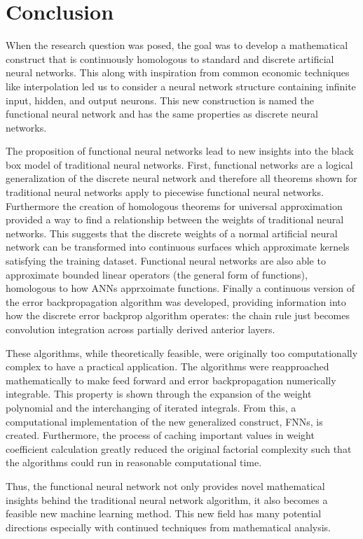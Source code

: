 \section{Conclusion}
When the research question was posed, the goal was to develop a mathematical construct that is continuously homologous to standard and discrete artificial neural networks. This along with inspiration from common economic techniques like interpolation led us to consider a neural network structure containing infinite input, hidden, and output neurons. This new construction is named the functional neural network and has the same properties as discrete neural networks.

The proposition of functional neural networks lead to new insights into the black box model of traditional neural networks. First, functional networks are a logical generalization of the discrete neural network and therefore all theorems shown for traditional neural networks apply to piecewise functional neural networks. Furthermore the creation of homologous theorems for universal approximation provided a way to find a relationship between the weights of traditional neural networks. This suggests that the discrete weights of a normal artificial neural network can be transformed into continuous surfaces which approximate kernels satisfying the training dataset. Functional neural networks are also able to approximate bounded linear operators (the general form of functions), homologous to how ANNs apprxoimate functions. Finally a continuous version of the error backpropagation algorithm was developed, providing information into how the discrete error backprop algorithm operates: the chain rule just becomes convolution integration across partially derived anterior layers.

These algorithms, while theoretically feasible, were originally too computationally complex to have a practical application. The algorithms were reapproached mathematically to make feed forward and error backpropagation numerically integrable.  This property is shown through the expansion of the weight polynomial and the interchanging of iterated integrals. From this, a computational implementation of the new generalized construct, FNNs, is created. Furthermore, the process of caching important values in weight coefficient calculation greatly reduced the original factorial complexity such that the algorithms could run in reasonable computational time.

Thus, the functional neural network not only provides novel mathematical insights behind the traditional neural network algorithm, it also becomes a feasible new machine learning method. This new field has many potential directions especially with continued techniques from mathematical analysis.

